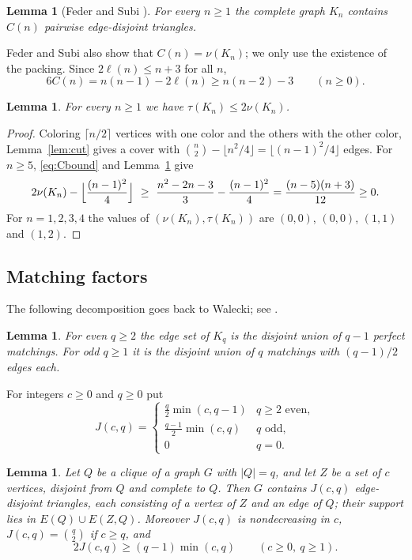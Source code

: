 \documentclass{amsart}
\newtheorem{lemma}[theorem]{Lemma}
\theoremstyle{definition}
\theoremstyle{remark}
\numberwithin{equation}{section}
\numberwithin{table}{section}
\begin{document}
\begin{lemma}[Feder and Subi {\cite[Theorem~2]{FederSubi}}]\label{lem:feder-subi}
For every $n\ge1$ the complete graph $K_n$ contains $C(n)$ pairwise edge-disjoint triangles.
\end{lemma}

Feder and Subi also show that $C(n)=\nu(K_n)$; we only use the existence of the packing. Since $2\ell(n)\le n+3$ for all $n$,
\begin{equation}\label{eq:Cbound}
6C(n)=n(n-1)-2\ell(n)\ge n(n-2)-3\qquad(n\ge0).
\end{equation}

\begin{lemma}\label{lem:complete}
For every $n\ge1$ we have $\tau(K_n)\le2\nu(K_n)$.
\end{lemma}

\begin{proof}
Coloring $\lceil n/2\rceil$ vertices with one color and the others with the other color, Lemma~\ref{lem:cut} gives a cover with $\binom n2-\lfloor n^2/4\rfloor=\lfloor (n-1)^2/4\rfloor$ edges. For $n\ge5$, \eqref{eq:Cbound} and Lemma~\ref{lem:feder-subi} give
\[
2\nu(K_n)-\Bigl\lfloor\frac{(n-1)^2}{4}\Bigr\rfloor\ \ge\ \frac{n^2-2n-3}{3}-\frac{(n-1)^2}{4}=\frac{(n-5)(n+3)}{12}\ge0.
\]
For $n=1,2,3,4$ the values of $(\nu(K_n),\tau(K_n))$ are $(0,0)$, $(0,0)$, $(1,1)$ and $(1,2)$.
\end{proof}

\subsection{Matching factors}
The following decomposition goes back to Walecki; see \cite[Lemma~3]{BBGHMNO}.

\begin{lemma}\label{lem:walecki}
For even $q\ge2$ the edge set of $K_q$ is the disjoint union of $q-1$ perfect matchings. For odd $q\ge1$ it is the disjoint union of $q$ matchings with $(q-1)/2$ edges each.
\end{lemma}

For integers $c\ge0$ and $q\ge0$ put
\[
J(c,q)=\begin{cases}
\frac q2\min(c,q-1) & q\ge2\text{ even},\\[2pt]
\frac{q-1}2\min(c,q) & q\text{ odd},\\[2pt]
0 & q=0.
\end{cases}
\]

\begin{lemma}\label{lem:factor}
Let $Q$ be a clique of a graph $G$ with $|Q|=q$, and let $Z$ be a set of $c$ vertices, disjoint from $Q$ and complete to $Q$. Then $G$ contains $J(c,q)$ edge-disjoint triangles, each consisting of a vertex of $Z$ and an edge of $Q$; their support lies in $E(Q)\cup E(Z,Q)$. Moreover $J(c,q)$ is nondecreasing in $c$, $J(c,q)=\binom q2$ if $c\ge q$, and
\begin{equation}\label{eq:Jbound}
2J(c,q)\ge(q-1)\min(c,q)\qquad(c\ge0,\ q\ge1).
\end{equation}
\end{lemma}
\end{document}
